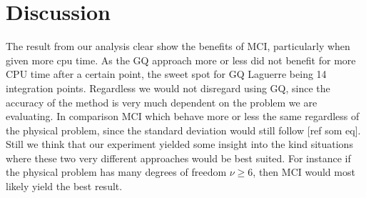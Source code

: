 \section{Discussion}
The result from our analysis clear show the benefits of MCI, particularly when
given more cpu time. As the GQ approach more or less did not benefit for more
CPU time after a certain point, the sweet spot for GQ Laguerre being 14
integration points. Regardless we would not disregard using GQ, since the
accuracy of the method is very much dependent on the problem we are evaluating.
In comparison MCI which behave more or less the same regardless of the physical
problem, since the standard deviation would still follow [ref som eq]. Still we
think that our experiment yielded some insight into the kind situations where
these two very different approaches would be best suited. For instance if the
physical problem has many degrees of freedom $\nu \ge 6 $, then MCI would most
likely yield the best result.    
